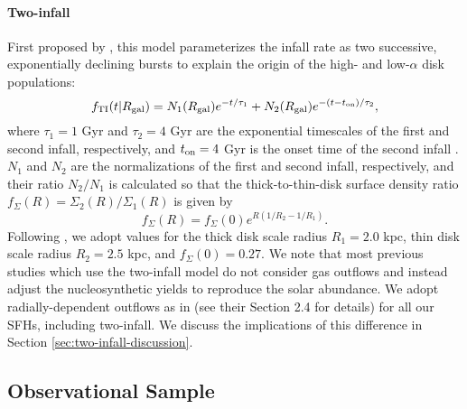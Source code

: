 \documentclass[twocolumn,twocolappendix,linenumbers]{aastex631}
\begin{document}
\paragraph{Two-infall} First proposed by \citet{Chiappini1997-TwoInfall}, this model parameterizes the infall rate as two successive, exponentially declining bursts to explain the origin of the high- and low-$\alpha$ disk populations:
\begin{equation}
    \label{eq:twoinfall-ifr}
    f_{\rm TI}(t|R_{\rm gal}) = N_1(R_{\rm gal}) e^{-t/\tau_1} + N_2(R_{\rm gal}) e^{-(t-t_{\rm on})/\tau_2},
\end{equation}
where $\tau_1=1$ Gyr and $\tau_2=4$ Gyr are the exponential timescales of the first and second infall, respectively, and $t_{\rm on}=4$ Gyr is the onset time of the second infall \citep[based on typical values in, e.g.,][]{Chiappini1997-TwoInfall,Spitoni2020-TwoInfall,Spitoni2021-TwoInfall}. $N_1$ and $N_2$ are the normalizations of the first and second infall, respectively, and their ratio $N_2/N_1$ is calculated so that the thick-to-thin-disk surface density ratio $f_\Sigma(R)=\Sigma_2(R)/\Sigma_1(R)$ is given by
\begin{equation}
    f_\Sigma(R) = f_\Sigma(0) e^{R(1/R_2 - 1/R_1)}.
\end{equation}
Following \citet{BlandHawthornGerhard2016-MilkyWayReview}, we adopt values for the thick disk scale radius $R_1=2.0$ kpc, thin disk scale radius $R_2=2.5$ kpc, and $f_\Sigma(0)=0.27$.
We note that most previous studies which use the two-infall model \citep[e.g.,][]{Chiappini1997-TwoInfall,Matteucci2006-BimodalDTDConsequences,Matteucci2009-DTDModels,Spitoni2019-TwoInfall} do not consider gas outflows and instead adjust the nucleosynthetic yields to reproduce the solar abundance. We adopt radially-dependent outflows as in  (see their Section 2.4 for details) for all our SFHs, including two-infall. We discuss the implications of this difference in Section \ref{sec:two-infall-discussion}.

\subsection{Observational Sample}
\label{sec:observational-sample}
\end{document}
